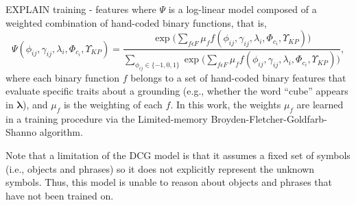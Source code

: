 \color{blue} 
EXPLAIN training - features
where $\Psi$ is a log-linear model composed of a weighted combination of hand-coded binary functions, that is,
\begin{equation}
\Psi(\phi_{ij},\gamma_{ij},\lambda_i,\Phi_{c_{i}},\Upsilon_{KP}) = \frac {\exp \Big( \sum\limits_{f \epsilon F} \mu_f f(\phi_{ij},\gamma_{ij},\lambda_i,\Phi_{c_{i}},\Upsilon_{KP}) \Big)}{\sum\limits_{\phi_{ij} \in \{-1,0,1\}}\exp \Big( \sum\limits_{f \epsilon F} \mu_f f(\phi_{ij},\gamma_{ij},\lambda_i,\Phi_{c_{i}},\Upsilon_{KP}) \Big)},
\label{eq:llm2}
\end{equation}
where each binary function $f$ belongs to a set of hand-coded binary features that evaluate specific traits about a grounding (e.g., whether the word ``cube'' appears in $\boldsymbol{\lambda}$), and $\mu_f$ is the weighting of each $f$. In this work,
the weights $\mu_f$ are learned in a training procedure via the Limited-memory Broyden-Fletcher-Goldfarb-Shanno algorithm.%
\color{black}

Note that a limitation of the DCG model is that it assumes a fixed set of symbols (i.e., objects and phrases) so it does not explicitly represent the unknown symbols. Thus, this model is unable to reason about objects and phrases that have not been trained on. 